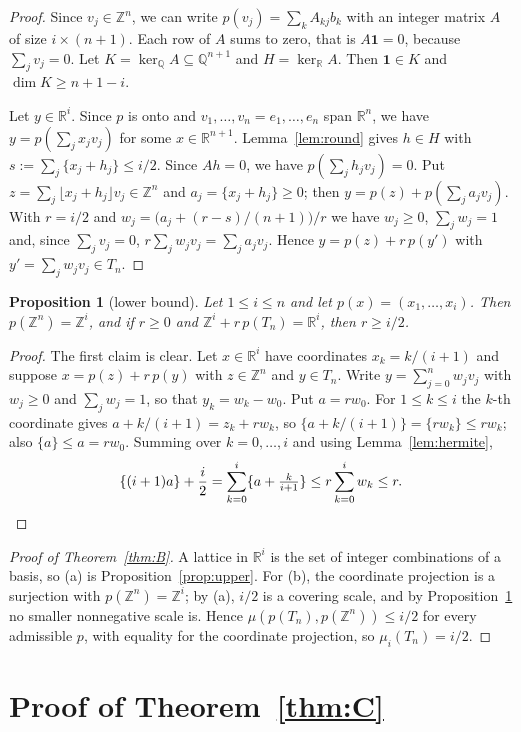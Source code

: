 \documentclass[11pt]{article}
\newtheorem{proposition}[theorem]{Proposition}
\theoremstyle{definition}
\theoremstyle{remark}
\newcommand{\R}{\mathbb R}
\newcommand{\Z}{\mathbb Z}
\newcommand{\Q}{\mathbb Q}
\newcommand{\one}{\mathbf 1}
\newcommand{\fr}[1]{\{#1\}}
\begin{document}
\begin{proof}
Since $v_j\in\Z^n$, we can write $p(v_j)=\sum_kA_{kj}b_k$ with an integer
matrix $A$ of size $i\times(n+1)$. Each row of $A$ sums to zero, that is
$A\one=0$, because $\sum_jv_j=0$. Let $K=\ker_\Q A\subseteq\Q^{n+1}$ and
$H=\ker_\R A$. Then $\one\in K$ and $\dim K\ge n+1-i$.

Let $y\in\R^i$. Since $p$ is onto and $v_1,\dots,v_n=e_1,\dots,e_n$ span $\R^n$, we have $y=p(\sum_jx_jv_j)$
for some $x\in\R^{n+1}$. Lemma~\ref{lem:round} gives $h\in H$ with
$s:=\sum_j\fr{x_j+h_j}\le i/2$. Since $Ah=0$, we have $p(\sum_jh_jv_j)=0$. Put
$z=\sum_j\lfloor x_j+h_j\rfloor v_j\in\Z^n$ and $a_j=\fr{x_j+h_j}\ge0$; then
$y=p(z)+p(\sum_ja_jv_j)$. With $r=i/2$ and
$w_j=\bigl(a_j+(r-s)/(n+1)\bigr)/r$ we have $w_j\ge0$, $\sum_jw_j=1$ and,
since $\sum_jv_j=0$, $r\sum_jw_jv_j=\sum_ja_jv_j$. Hence
$y=p(z)+r\,p(y')$ with $y'=\sum_jw_jv_j\in T_n$.
\end{proof}

\begin{proposition}[lower bound]\label{prop:lower}
Let $1\le i\le n$ and let $p(x)=(x_1,\dots,x_i)$. Then $p(\Z^n)=\Z^i$, and if
$r\ge0$ and $\Z^i+r\,p(T_n)=\R^i$, then $r\ge i/2$.
\end{proposition}

\begin{proof}
The first claim is clear. Let $x\in\R^i$ have coordinates $x_k=k/(i+1)$ and
suppose $x=p(z)+r\,p(y)$ with $z\in\Z^n$ and $y\in T_n$. Write
$y=\sum_{j=0}^nw_jv_j$ with $w_j\ge0$ and $\sum_jw_j=1$, so that
$y_k=w_k-w_0$. Put $a=rw_0$. For $1\le k\le i$ the $k$-th coordinate gives
$a+k/(i+1)=z_k+rw_k$, so $\fr{a+k/(i+1)}=\fr{rw_k}\le rw_k$; also
$\fr a\le a=rw_0$. Summing over $k=0,\dots,i$ and using Lemma~\ref{lem:hermite},
\[
\fr{(i+1)a}+\frac i2=\sum_{k=0}^{i}\fr{a+\tfrac k{i+1}}\le r\sum_{k=0}^iw_k\le r .
\qedhere
\]
\end{proof}

\begin{proof}[Proof of Theorem~\ref{thm:B}]
A lattice in $\R^i$ is the set of integer combinations of a basis, so (a) is
Proposition~\ref{prop:upper}. For (b), the coordinate projection is a
surjection with $p(\Z^n)=\Z^i$; by (a), $i/2$ is a covering scale, and by
Proposition~\ref{prop:lower} no smaller nonnegative scale is. Hence
$\mu(p(T_n),p(\Z^n))\le i/2$ for every admissible $p$, with equality for the
coordinate projection, so $\mu_i(T_n)=i/2$.
\end{proof}

\section{Proof of Theorem~\ref{thm:C}}\label{sec:C}
\end{document}
